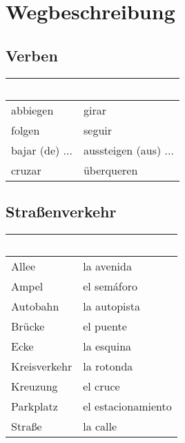 \documentclass{spanish_summary}
\begin{document}
  \section*{Wegbeschreibung}
  \subsection*{Verben}
  \begin{longtable}{p{} | p{}} 
    \textbf{~}     & \textbf{~}                                       \\ \hline
    abbiegen & girar\\
    folgen & seguir\\
    bajar (de) ... & aussteigen (aus) ...\\
    cruzar & überqueren\\
  \end{longtable}

  \newpage

  \subsection*{Straßenverkehr}
  \begin{longtable}{p{} | p{}} 
    \textbf{~}     & \textbf{~}                                       \\ \hline
    Allee & la avenida\\
    Ampel & el semáforo \\
    Autobahn & la autopista \\
    Brücke & el puente \\
    Ecke & la esquina\\
    Kreisverkehr & la rotonda\\
    Kreuzung & el cruce \\
    Parkplatz & el estacionamiento\\
    Straße & la calle \\
  \end{longtable}
  
\end{document}

